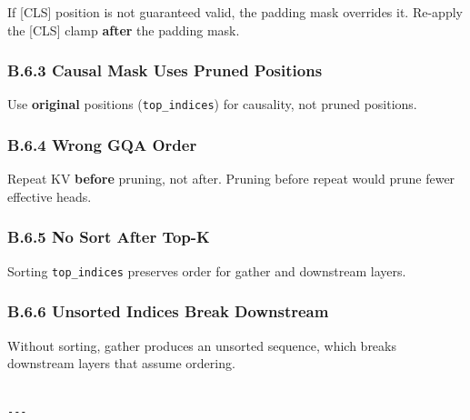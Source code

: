 If [CLS] position is not guaranteed valid, the padding mask overrides it. 
Re-apply the [CLS] clamp \textbf{after} the padding mask.

\subsubsection{B.6.3 Causal Mask Uses Pruned Positions}

Use \textbf{original} positions (\texttt{top\_indices}) for causality, not pruned 
positions.

\subsubsection{B.6.4 Wrong GQA Order}

Repeat KV \textbf{before} pruning, not after. Pruning before repeat would prune 
fewer effective heads.

\subsubsection{B.6.5 No Sort After Top-K}

Sorting \texttt{top\_indices} preserves order for gather and downstream layers.

\subsubsection{B.6.6 Unsorted Indices Break Downstream}

Without sorting, gather produces an unsorted sequence, which breaks 
downstream layers that assume ordering.
\begin{lstlisting}

---
\end{lstlisting}
